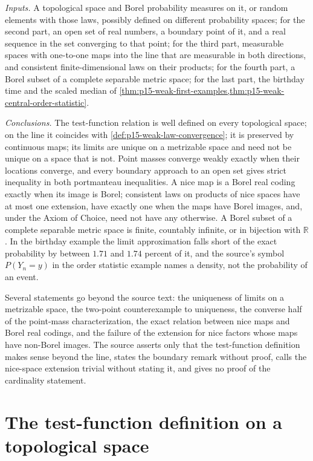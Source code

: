 \emph{Inputs.} A topological space and Borel probability measures on
it, or random elements with those laws, possibly defined on different
probability spaces; for the second part, an open set of real numbers,
a boundary point of it, and a real sequence in the set converging to
that point; for the third part, measurable spaces with one-to-one maps
into the line that are measurable in both directions, and consistent
finite-dimensional laws on their products; for the fourth part, a Borel
subset of a complete separable metric space; for the last part, the
birthday time and the scaled median of
\cref{thm:p15-weak-first-examples,thm:p15-weak-central-order-statistic}.

\emph{Conclusions.} The test-function relation is well defined on every
topological space; on the line it coincides with
\cref{def:p15-weak-law-convergence}; it is preserved by continuous maps;
its limits are unique on a metrizable space and need not be unique on a
space that is not. Point masses converge weakly exactly when their
locations converge, and every boundary approach to an open set gives
strict inequality in both portmanteau inequalities. A nice map is a
Borel real coding exactly when its image is Borel; consistent laws on
products of nice spaces have at most one extension, have exactly one when
the maps have Borel images, and, under the Axiom of Choice, need not have
any otherwise. A Borel subset of a
complete separable metric space is finite, countably infinite, or in
bijection with \(\mathbb R\). In the birthday example the limit
approximation falls short of the exact probability by between
\(1.71\) and \(1.74\) percent of it, and the source's symbol
\(P(Y_n=y)\) in the order statistic example names a density, not the
probability of an event.

Several statements go beyond the source text: the uniqueness of limits
on a metrizable space, the two-point counterexample to uniqueness, the
converse half of the point-mass characterization, the exact relation
between nice maps and Borel real codings, and the failure of the
extension for nice factors whose maps have non-Borel images. The source
asserts only that the test-function definition makes sense beyond the
line, states the boundary remark without proof, calls the nice-space
extension trivial without stating it, and gives no proof of the
cardinality statement.

\section{The test-function definition on a topological space}
\label{sec:p15-w02c-p15-004-topological}

